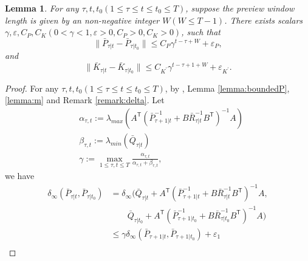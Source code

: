 \documentclass{article}
\newcommand{\transpose}{\mathsf{T}}
\newtheorem{lemma}{Lemma}
\begin{document}
\begin{lemma}\label{lemma:boundedPK}
    For any $\tau,t,t_{0}(1\leq \tau\leq t\leq t_{0}\leq T)$, suppose the preview window length is given by an non-negative integer $W(W\leq T-1)$. There exists scalars $\gamma,\varepsilon,C_{P},C_{K}(0<\gamma<1,\varepsilon>0,C_{P}>0,C_{K}>0)$, such that
    \begin{equation}
        \|\bar{P}_{\tau|t}-\bar{P}_{\tau|t_{0}}\| \leq C_{P}\gamma^{t-\tau+W}+\varepsilon_{P},
    \end{equation}
    and
    \begin{equation}
        \|\bar{K}_{\tau|t}-\bar{K}_{\tau|t_{0}}\| \leq C_{K^{'}}\gamma^{t-\tau+1+W}+\varepsilon_{K^{'}}.
    \end{equation}
\end{lemma}
\begin{proof}
     For any $\tau,t,t_{0}(1\leq \tau\leq t\leq t_{0}\leq T)$, by \cite[Lemma D.2]{krauth_finite-time_2019}, Lemma \ref{lemma:boundedP}, \ref{lemma:m} and Remark \ref{remark:delta}. 
     Let
     \begin{align*}
        &\alpha_{\tau,t} := \lambda_{max}(A^{\transpose}(\bar{P}_{\tau+1|t}^{-1}+B\bar{R}_{\tau|t}^{-1}B^{\transpose})^{-1}A)\\
        &\beta_{\tau,t} := \lambda_{min}(\bar{Q}_{\tau|t})\\ 
        &\gamma := \max_{1\leq \tau,t \leq T} \frac{\alpha_{\tau,t}}{\alpha_{\tau,t}+\beta_{\tau,t}}, 
     \end{align*}
     we have
    \begin{align*}
        \delta_{\infty}(\bar{P}_{\tau|t},\bar{P}_{\tau|t_{0}}) &= \delta_{\infty}(\bar{Q}_{\tau|t}+A^{\transpose}(\bar{P}_{\tau+1|t}^{-1}+B\bar{R}_{\tau|t}^{-1}B^{\transpose})^{-1}A,\\
        & \qquad \bar{Q}_{\tau|t_{0}}+A^{\transpose}(\bar{P}_{\tau+1|t_{0}}^{-1}+B\bar{R}_{\tau|t_{0}}^{-1}B^{\transpose})^{-1}A)\\
        &\leq \gamma\delta_{\infty}(\bar{P}_{\tau+1|t},\bar{P}_{\tau+1|t_{0}}) + \varepsilon_{1}\\

\end{align*}
\end{proof}
\end{document}
